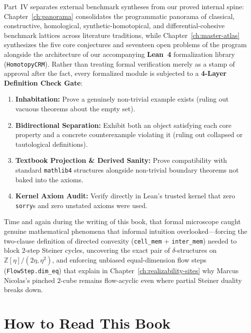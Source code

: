 \documentclass[10pt,twoside,openright]{book}
\theoremstyle{crmplain}
\theoremstyle{crmdef}
\theoremstyle{crmremark}
\begin{document}
Part~IV separates external benchmark syntheses from our proved internal spine: Chapter~\ref{ch:panorama} consolidates the programmatic panorama of classical, constructive, homological, synthetic-homotopical, and differential-cohesive benchmark lattices across literature traditions, while Chapter~\ref{ch:master-atlas} synthesizes the five core conjectures and seventeen open problems of the program alongside the architecture of our accompanying \textbf{Lean~4} formalization library (\texttt{HomotopyCRM}). Rather than treating formal verification merely as a stamp of approval after the fact, every formalized module is subjected to a \textbf{4-Layer Definition Check Gate}:
\begin{enumerate}
  \item \textbf{Inhabitation:} Prove a genuinely non-trivial example exists (ruling out vacuous theorems about the empty set).
  \item \textbf{Bidirectional Separation:} Exhibit both an object satisfying each core property and a concrete counterexample violating it (ruling out collapsed or tautological definitions).
  \item \textbf{Textbook Projection \& Derived Sanity:} Prove compatibility with standard \texttt{mathlib4} structures alongside non-trivial boundary theorems not baked into the axioms.
  \item \textbf{Kernel Axiom Audit:} Verify directly in Lean's trusted kernel that zero \texttt{sorry}s and zero unstated axioms were used.
\end{enumerate}

Time and again during the writing of this book, that formal microscope caught genuine mathematical phenomena that informal intuition overlooked---forcing the two-clause definition of directed convexity (\texttt{cell\_mem} + \texttt{inter\_mem}) needed to block $2$-step Steiner cycles, uncovering the exact pair of $\delta$-structures on $\mathbb{Z}[\eta]/(2\eta, \eta^2)$, and enforcing unbiased equal-dimension flow steps (\texttt{FlowStep.\allowbreak dim\_eq}) that explain in Chapter~\ref{ch:realizability-sites} why Marcus Nicolas's pinched $2$-cube remains flow-acyclic even where partial Steiner duality breaks down.

\section*{How to Read This Book}
\end{document}
